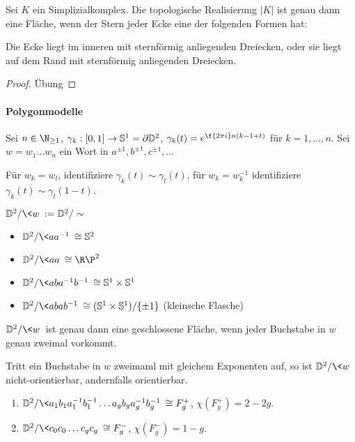 \begin{st}
	Sei $K$ ein Simplizialkomplex.
	Die topologische Realisierung $|K|$ ist genau dann eine Fläche, wenn der Stern jeder Ecke eine der folgenden Formen hat:

	Die Ecke liegt im inneren mit sternförmig anliegenden Dreiecken, oder sie liegt auf dem Rand mit sternförmig anliegenden Dreiecken.
	\begin{proof}
		Übung
	\end{proof}
\end{st}

\paragraph{Polygonmodelle}

Sei $n \in \N_{\ge 1}$, $\gamma_k: [0,1] \to \mathbb{S}^1 = \partial \mathbb{D}^2$, $\gamma_k(t) = e^{\f {2\pi i}n (k-1 + t)}$ für $k = 1, \dotsc, n$.
Sei $w = w_1 \dotsc w_n$ ein Wort  in $a^{\pm 1}, b^{\pm 1}, c^{\pm 1}, \dotsc$

Für $w_k = w_l$, identifiziere $\gamma_k(t) \sim \gamma_l(t)$, für $w_k = w_k^{-1}$ identifiziere $\gamma_k(t) \sim \gamma_l(1-t)$.

\begin{df}
	$\D^2 / \<w\> := \D^2 / \sim$
\end{df}

\begin{ex}
	\begin{itemize}
		\item
			$\D^2 / \<aa^{-1}\> \homeomorphic \S^2$
		\item
			$\D^2 / \<aa\> \homeomorphic \R\P^2$
		\item
			$\D^2 / \<aba^{-1}b^{-1}\> \homeomorphic \S^1 \times \S^1$
		\item
			$\D^2 / \<abab^{-1}\> \homeomorphic (\S^1 \times \S^1) / \{\pm 1\}$ (kleinsche Flasche)
	\end{itemize}
\end{ex}

\begin{st}
	$\D^2 / \<w\>$ ist genau dann eine geschlossene Fläche, wenn jeder Buchstabe in $w$ genau zweimal vorkommt.

	Tritt ein Buchstabe in $w$ zweimaml mit gleichem Exponenten auf, so ist $\D^2 / \<w\>$ nicht-orientierbar, andernfalls orientierbar.
\end{st}

\begin{ex}
	\begin{enumerate}[(1)]
		\item
			$\D^2 / \<a_1b_1a_1^{-1}b_1^{-1} \dotsc a_gb_ga_g^{-1}b_g^{-1} \> \homeomorphic F_g^+$,
			$\chi(F_g^+) = 2 - 2g$.
		\item
			$\D^2 / \<c_0c_0 \dotsc c_gc_g\> \homeomorphic F_g^-$,
			$\chi(F_g^-) = 1 - g$.
	\end{enumerate}
\end{ex}


